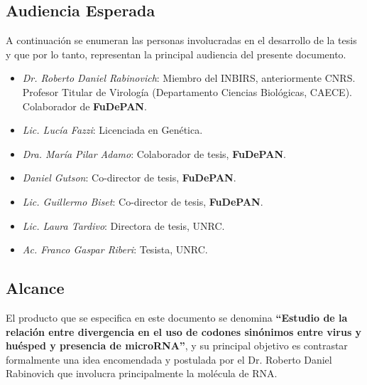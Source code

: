 \documentclass[12pt,a4paper,spanish]{article}
\begin{document}
\subsection{Audiencia Esperada}
\par A continuación se enumeran las personas involucradas en el desarrollo de la
tesis y que por lo tanto, representan la principal audiencia del presente documento.
\begin{itemize}
	\item \textit{Dr. Roberto Daniel Rabinovich}: Miembro del INBIRS, anteriormente CNRS. Profesor Titular de Virología (Departamento Ciencias Biológicas,
 												CAECE). Colaborador de \textbf{FuDePAN}.
	\item \textit{Lic. Lucía Fazzi}: Licenciada en Genética.
	\item \textit{Dra. María Pilar Adamo}: Colaborador de tesis, \textbf{FuDePAN}. 
	\item \textit{Daniel Gutson}: Co-director de tesis, \textbf{FuDePAN}. 
	\item \textit{Lic. Guillermo Biset}: Co-director de tesis, \textbf{FuDePAN}. 
	\item \textit{Lic. Laura Tardivo}: Directora de tesis, UNRC. 
	\item \textit{Ac. Franco Gaspar Riberi}: Tesista, UNRC.
\end{itemize}

\subsection{Alcance}
\par El producto que se especifica en este documento se denomina \textbf{``Estudio de la relación entre divergencia en el uso de codones 
sinónimos entre virus y huésped y presencia de microRNA''}, y su principal objetivo es contrastar formalmente una idea encomendada y
postulada por el Dr. Roberto Daniel Rabinovich que involucra principalmente 
la molécula de RNA. 
\end{document}

